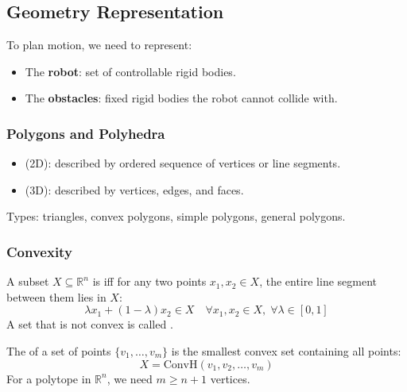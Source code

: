 \bigseparator

\subsection{Geometry Representation}

To plan motion, we need to represent:
\begin{itemize}
  \item The \textbf{robot}: set of controllable rigid bodies.
  \item The \textbf{obstacles}: fixed rigid bodies the robot cannot collide with.
\end{itemize}

\separator

\subsubsection{Polygons and Polyhedra}

\begin{defbox}
\begin{itemize}
  \item {} (2D): described by ordered sequence of vertices or line segments.
  \item {} (3D): described by vertices, edges, and faces.
\end{itemize}
Types: triangles, convex polygons, simple polygons, general polygons.
\end{defbox}

\separator

\subsubsection{Convexity}

\begin{defbox}
A subset $X \subseteq \mathbb{R}^n$ is  iff for any two points $x_1, x_2 \in X$, the entire line segment between them lies in $X$:
\[
\lambda x_1 + (1-\lambda) x_2 \in X \quad \forall x_1, x_2 \in X, \; \forall \lambda \in [0,1]
\]
A set that is not convex is called .
\end{defbox}

\begin{defbox}
The  of a set of points $\{v_1, \ldots, v_m\}$ is the smallest convex set containing all points:
\[
X = \text{ConvH}(v_1, v_2, \ldots, v_m)
\]
For a polytope in $\mathbb{R}^n$, we need $m \geq n+1$ vertices.
\end{defbox}

